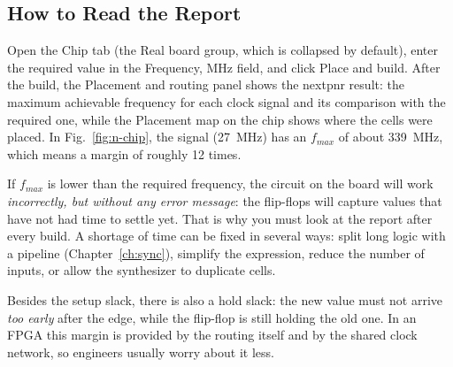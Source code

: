 \subsection{How to Read the Report}

Open the Chip tab (the Real board group, which is collapsed by default), enter
the required value in the Frequency, MHz field, and click Place and build.
After the build, the Placement and routing panel shows the nextpnr result: the
maximum achievable frequency for each clock signal and its comparison with the
required one, while the Placement map on the chip shows where the cells were
placed. In Fig.~\ref{fig:n-chip}, the  signal (27~MHz) has an
$f_{max}$ of about 339~MHz, which means a margin of roughly 12 times.


If $f_{max}$ is lower than the required frequency, the circuit on the board
will work \emph{incorrectly, but without any error message}: the flip-flops
will capture values that have not had time to settle yet. That is why you must
look at the report after every build. A shortage of time can be fixed in
several ways: split long logic with a pipeline (Chapter~\ref{ch:sync}),
simplify the expression, reduce the number of inputs, or allow the synthesizer
to duplicate cells.

\begin{infobox}
Besides the setup slack, there is also a hold slack: the new value must not
arrive \emph{too early} after the edge, while the flip-flop is still holding the
old one. In an FPGA this margin is provided by the routing itself and by the
shared clock network, so engineers usually worry about it less.
\end{infobox}


